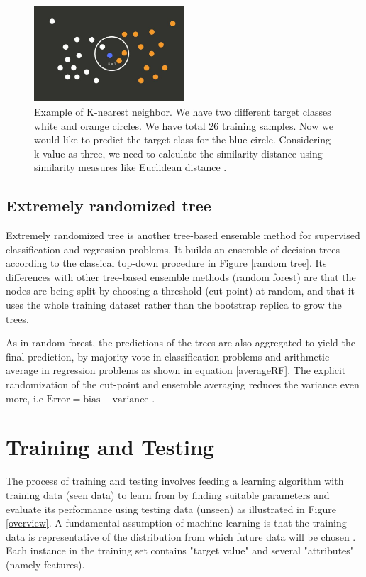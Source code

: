 \begin{figure}[H]
  \centering
    \includegraphics[width=0.5\textwidth]{images/Kn.jpg}
    \caption{Example of K-nearest neighbor. We have two different target classes white and orange circles. We have total 26 training samples. Now we would like to predict the target class for the blue circle. Considering k value as three, we need to calculate the similarity distance using similarity measures like Euclidean distance \citep{K-NNALGORITHM}.}
  \label{kn}
\end{figure}

\subsection{Extremely randomized tree}

Extremely randomized tree is another tree-based ensemble method for supervised classification and regression problems. It builds an ensemble of decision trees according to the classical top-down procedure in Figure \ref{random tree}. Its differences with other tree-based ensemble methods (random forest) are that the nodes are being split by choosing a threshold (cut-point) at random, and that it uses the whole training dataset rather than the bootstrap replica to grow the trees.  

As in random forest, the predictions of the trees are also aggregated to yield the final prediction, by majority vote in classification problems and arithmetic average in regression problems as shown in equation \ref{averageRF}. The explicit randomization of the cut-point and ensemble averaging reduces the variance even more, i.e $\text{Error}=\text{bias} - \text{variance}$ \citep{geurts2006extremely}. 
\section{Training and Testing}
\label{TT}
The process of training and testing involves feeding a learning algorithm with training data (seen data) to learn from by finding suitable parameters and evaluate its performance using testing data (unseen) as illustrated in Figure \ref{overview}. A fundamental assumption of machine learning is that the training data is representative of the distribution from which future data  will be chosen \citep{witten2016data}. Each instance in the training set contains "target value" and several "attributes" (namely features). 

